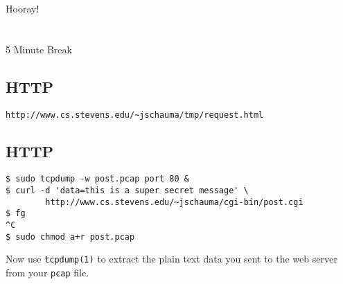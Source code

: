 \documentclass[xga]{xdvislides}
\begin{document}
\newpage
\vspace*{\fill}
\begin{center}
    \Hugesize
        Hooray! \\ [1em]
    \hspace*{5mm}
    \blueline\\
    \hspace*{5mm}\\
        5 Minute Break
\end{center}
\vspace*{\fill}



\subsection{HTTP}
\begin{verbatim}
http://www.cs.stevens.edu/~jschauma/tmp/request.html
\end{verbatim}

\subsection{HTTP}
\begin{verbatim}
$ sudo tcpdump -w post.pcap port 80 &
$ curl -d 'data=this is a super secret message' \
        http://www.cs.stevens.edu/~jschauma/cgi-bin/post.cgi
$ fg
^C
$ sudo chmod a+r post.pcap
\end{verbatim}

Now use {\tt tcpdump(1)} to extract the plain text data you sent
to the web server from your {\tt pcap} file.
\end{document}
